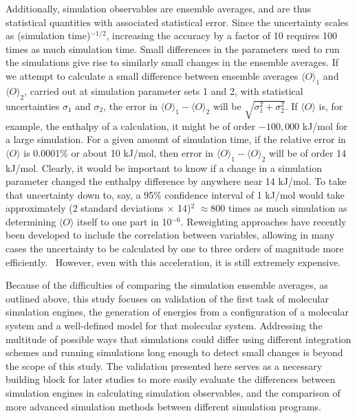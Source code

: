 Additionally, simulation observables are ensemble averages, and are
thus statistical quantities with associated statistical error. Since
the uncertainty scales as (simulation time)$^{-1/2}$, increasing the
accuracy by a factor of 10 requires 100 times as much simulation
time. Small differences in the parameters used to run the simulations
give rise to similarly small changes in the ensemble
averages. If we attempt to calculate a small difference between
ensemble averages $\langle O \rangle_1$ and $\langle O \rangle_2$,
carried out at simulation parameter sets 1 and 2, with statistical
uncertainties $\sigma_1$ and $\sigma_2$, the error in $\langle O
\rangle_1 - \langle O \rangle_2$ will be
$\sqrt{\sigma_1^2+\sigma_2^2}$. If $\langle O \rangle$ is, for
example, the enthalpy of a calculation, it might be of order
$-100,000$ kJ/mol for a large simulation.  For a given amount of
simulation time, if the relative error in $\langle O \rangle$ is
0.0001\% or about 10 kJ/mol, then error in $\langle O\rangle_1 -
\langle O \rangle_2$ will be of order 14 kJ/mol. Clearly, it would be
important to know if a change in a simulation parameter changed the
enthalpy difference by anywhere near 14 kJ/mol. To take that
uncertainty down to, say, a 95\% confidence interval of 1 kJ/mol would
take approximately (2 standard deviations $\times$ 14)$^2$ $\approx 800$ times as much
simulation as determining $\langle O \rangle$ itself to one part in
10$^{-6}$.  Reweighting approaches have recently been developed to
include the correlation between variables, allowing in many cases the
uncertainty to be calculated by one to three orders of magnitude more
efficiently.~\cite{Paliwal2013} However, even with this acceleration,
it is still extremely expensive.

Because of the difficulties of comparing the simulation ensemble
averages, as outlined above, this study focuses on validation of the
first task of molecular simulation engines, the generation of energies
from a configuration of a molecular system and a well-defined model
for that molecular system. Addressing the multitude of possible ways
that simulations could differ using different integration schemes and
running simulations long enough to detect small changes is beyond the
scope of this study. The validation presented here serves as a
necessary building block for later studies to more easily evaluate the
differences between simulation engines in calculating simulation
observables, and the comparison of more advanced simulation methods
between different simulation programs.

